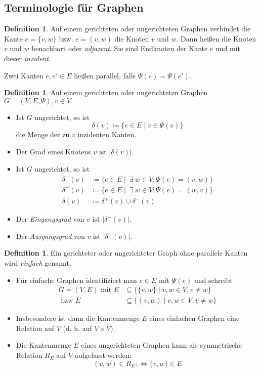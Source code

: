 \documentclass[a4paper,12pt]{article}
\theoremstyle{definition}
\newtheorem{definition}[axiom]{Definition}
\let\oldexist\exists
\renewcommand{\exists}{\:\oldexist \: }
\begin{document}
	\subsection{Terminologie für Graphen}
	\begin{definition}
		Auf einem gerichteten oder ungerichteten Graphen verbindet die Kante $e = \{v, w\}$ bzw. $e = (v, w)$ die Knoten $v$ und $w$. Dann heißen die Knoten $v$ und $w$ benachbart oder {\itshape adjazent}. Sie sind Endknoten der Kante $e$ und mit dieser {\itshape inzident}.
		
		Zwei Kanten $e, e' \in E$ heißen parallel, falls $\Psi(e) = \Psi(e')$.
	\end{definition}
	\begin{definition}
		Auf einem gerichteten oder ungerichteten Graphen $G = (V, E, \Psi), v \in V$
		\begin{itemize}
			\item Ist $G$ ungerichtet, so ist
			\[
				\delta(v) \coloneq \{e \in E \mid v \in \Psi(e)\}
			\]
			die Menge der zu $v$ inzidenten Kanten.
			\item Der Grad eines Knotens $v$ ist $\lvert \delta(v) \rvert$.
			\item Ist $G$ ungerichtet, so ist
			\begin{align*}
				\delta^+(v) &\coloneq \{e \in E \mid \exists w \in V: \Psi(e) = (v, w)\}\\
				\delta^-(v) &\coloneq \{e \in E \mid \exists w \in V: \Psi(e) = (w, v)\}\\
				\delta(v) &\coloneq \delta^+(v) \cup \delta^-(v)
			\end{align*}
			\item Der {\itshape Eingangsgrad} von $v$ ist $\lvert \delta^-(v) \rvert$.
			\item Der {\itshape Ausgangsgrad} von $v$ ist $\lvert \delta^+(v) \rvert$.
		\end{itemize}
	\end{definition}
	\begin{definition}
		Ein gerichteter oder ungerichteter Graph ohne parallele Kanten wird {\itshape einfach} genannt.
		\begin{itemize}
			\item Für einfache Graphen identifiziert man $e \in E$ mit $\Psi(e)$ und schreibt
			\begin{align*}
				G = (V, E) \text{ mit } E &\subseteq \{\{v, w\} \mid v, w \in V, v \neq w\}\\
				\text{ bzw } E &\subseteq \{(v, w) \mid v, w \in V, v \neq w\}
			\end{align*}
			\item Insbesondere ist dann die Kantenmenge $E$ eines einfachen Graphen eine Relation auf $V$ (d. h. auf $V \times V$).
			\item Die Kantenmenge $E$ eines ungerichteten Graphen kann als symmetrische Relation $R_E$ auf $V$ aufgefasst werden:
			\[
				(v, w) \in R_E :\Longleftrightarrow \{v, w\} \in E
			\]
		\end{itemize}
	\end{definition}
\end{document}

